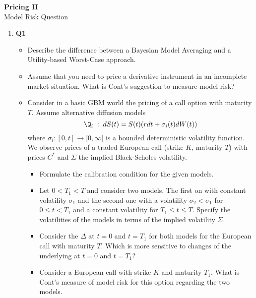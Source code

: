 \documentclass[11pt,a4paper,titlepage]{article}
\begin{document}
\setlength{\topmargin}{-2.5cm}

\begin{center} {\LARGE \bf Pricing II } \\[5mm]
                {\large Model Risk Question }
\end{center}

\vspace{0.3cm}

\pagestyle{empty}


\begin{enumerate}

\vspace{0.3cm}

\item[]{\bf Q1} 

\begin{itemize}
\item[(a)]
Describe the difference between a Bayesian Model Averaging and a Utility-based Worst-Case
approach. 
\item[(b)] Assume that you need to price a derivative instrument in an incomplete market situation. What is Cont's suggestion to measure model risk?
\item[(c)] 
Consider in a basic GBM world the pricing of a call option with maturity $T$. 
Assume alternative diffusion models
\begin{equation}
\Q_i\;:\; dS(t) = S(t)(r dt + \sigma_i(t) dW(t))
\end{equation}
where $ \sigma_i: [0,t] \rightarrow [0, \infty[ $ is a bounded deterministic volatility function.
We observe prices of a traded European call (strike $K$, maturity $T$) with prices $C^*$ and
$\Sigma$ the implied Black-Scholes volatility.
\begin{itemize}
\item[(i)]
Formulate the calibration condition for the given models.
\item[(ii)]
Let $0< T_1 <T$ and consider two models. The first on with constant volatility $\sigma_1$ and the second one with a volatility $\sigma_2 < \sigma _1$ for $0 \leq t <T_1$ and a constant volatility for $T_1\leq t \leq T$. Specify  the  volatilities of the models in terms of the implied volatility $\Sigma $.
\item[(iii)]
Consider the $\Delta$ at $t=0$ and $t=T_1$ for both models for the European call with maturity $T$. Which is more sensitive to changes of the underlying at $t=0$ and $t=T_1$? 
\item[(iv)]
Consider  a  European call with strike $K$ and maturity $T_1$. What is Cont's measure of model risk for this option regarding the two models. 
\end{itemize}
\end{itemize}


\end{enumerate}
\end{document}
